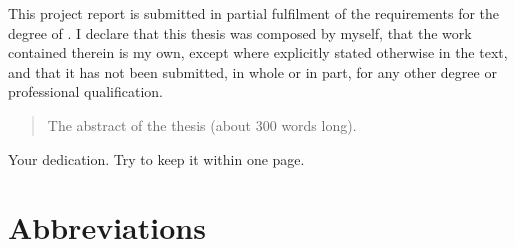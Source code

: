 

\begin{declaration}{
    This project report is submitted in partial fulfilment of the requirements for the degree of \degreetext.
    I declare that this thesis was composed by myself, that the work contained therein is my own, except where explicitly stated otherwise in the text, and that it has not been submitted, in whole or in part, for any other degree or professional qualification.
}\end{declaration}




\begin{abstract}
    The abstract of the thesis (about 300 words long).
\end{abstract}



\begin{dedication}
    Your dedication. Try to keep it within one page.
\end{dedication}



\tableofcontents

\listoffigures

\listoftables



\chapter*{Abbreviations}
\glsunsetall %
\glsaddall
\glsaddallunused
{}
\printglossary[type=\acronymtype,title={}]
